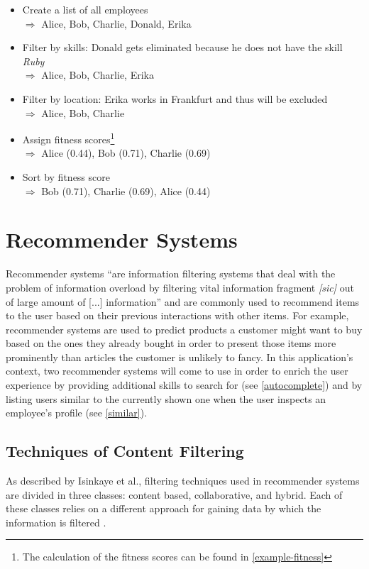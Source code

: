 \begin{itemize}
  \item Create a list of all employees\\
    $\Rightarrow$ Alice, Bob, Charlie, Donald, Erika
  \item Filter by skills: Donald gets eliminated because he does not have the skill \textit{Ruby}\\
    $\Rightarrow$ Alice, Bob, Charlie, Erika
  \item Filter by location: Erika works in Frankfurt and thus will be excluded\\
    $\Rightarrow$ Alice, Bob, Charlie
  \item Assign fitness scores\footnote{The calculation of the fitness scores can be found in \ref{example-fitness}}\\
    $\Rightarrow$ Alice (0.44), Bob (0.71), Charlie (0.69)
  \item Sort by fitness score\\
    $\Rightarrow$ Bob (0.71), Charlie (0.69), Alice (0.44)
\end{itemize}


\section{Recommender Systems}
Recommender systems ``are information filtering systems that deal with the problem of information overload by filtering vital information fragment \textit{[sic]} out of large amount of [...] information'' \cite{Isinkaye2015261}\label{recommender-definition} and are commonly used to recommend items to the user based on their previous interactions with other items. For example, recommender systems are used to predict products a customer might want to buy based on the ones they already bought in order to present those items more prominently than articles the customer is unlikely to fancy. In this application's context, two recommender systems will come to use in order to enrich the user experience by providing additional skills to search for (see \ref{autocomplete}) and by listing users similar to the currently shown one when the user inspects an employee's profile (see \ref{similar}).

\subsection{Techniques of Content Filtering}
As described by Isinkaye et al., filtering techniques used in recommender systems are divided in three classes: content based, collaborative, and hybrid. Each of these classes relies on a different approach for gaining data by which the information is filtered \cite{Isinkaye2015261}.

